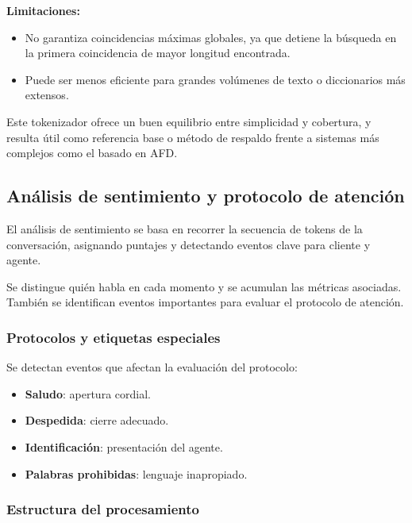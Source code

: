 \textbf{Limitaciones:}

\begin{itemize}
	\item No garantiza coincidencias máximas globales, ya que detiene la búsqueda en la primera
	      coincidencia de mayor longitud encontrada.

	\item Puede ser menos eficiente para grandes volúmenes de texto o diccionarios más
	      extensos.
\end{itemize}

Este tokenizador ofrece un buen equilibrio entre simplicidad y cobertura, y resulta útil como
referencia base o método de respaldo frente a sistemas más complejos como el basado en AFD.

\subsection{Análisis de sentimiento y protocolo de atención}

El análisis de sentimiento se basa en recorrer la secuencia de tokens de la conversación,
asignando puntajes y detectando eventos clave para cliente y agente.

Se distingue quién habla en cada momento y se acumulan las métricas asociadas. También se
identifican eventos importantes para evaluar el protocolo de atención.

\subsubsection{Protocolos y etiquetas especiales}

Se detectan eventos que afectan la evaluación del protocolo:

\begin{itemize}
	\item \textbf{Saludo}: apertura cordial.
	\item \textbf{Despedida}: cierre adecuado.
	\item \textbf{Identificación}: presentación del agente.
	\item \textbf{Palabras prohibidas}: lenguaje inapropiado.
\end{itemize}

\subsubsection{Estructura del procesamiento}

